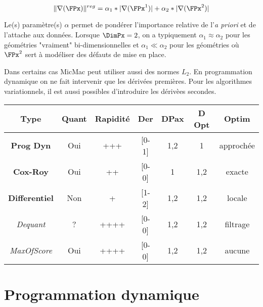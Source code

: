 \begin{equation}
\label{CostGrad:Lun:DDeux}
   \| \nabla(\FPx) \|^{reg} = \alpha_1*|\nabla(\FPx^1)|+\alpha_2*|\nabla(\FPx^2)|
\end{equation}

Le(s) param\`etre(s) $\alpha$ permet de pond\'erer l'importance relative
de l'\emph{a priori} et de l'attache aux donn\'ees.
Lorsque  $\DimPx=2$, on a typiquement 
$\alpha_1 \approx \alpha_2$ pour les g\'eom\'etries "vraiment"
bi-dimensionnelles et  $\alpha_1 \ll \alpha_2$ pour les
g\'eom\'etries o\`u $\FPx^2$ sert \`a mod\'eliser des d\'efauts de mise
en place.

Dans certains cas MicMac peut utiliser aussi des normes $L_2$. 
En programmation dynamique on ne fait intervenir que les d\'eriv\'ees
premi\`eres. Pour les algorithmes variationnels, il est aussi
possibles d'introduire les d\'eriv\`ees secondes.

\begin{tabular} { c | c | c | c| c| c | c} %

 {\bf Type }        &  {Quant} & {Rapidit\'e} & {Der} &  {DPax} &  {D Opt} & {Optim}\\  \hline \hline
 {\bf Prog Dyn }    &  {Oui} & {+++} &          {[0-1]} & {1,2} & {1} &{approch\'ee}\\  \hline 
 {\bf Cox-Roy }     &  {Oui} & {++} &           {[0-0]} & {1} & {1,2} & {exacte}\\  \hline 
 {\bf Differentiel }&  {Non} & {+} &            {[1-2]} & {1,2} & {1,2} &{locale} \\  \hline  \hline
 {\it Dequant }     &  {?} & {++++} &           {[0-0]} & {1,2} & {1,2} &{filtrage}\\  \hline 
 {\it MaxOfScore }  &  {Oui} & {++++} &         {[0-0]} & {1,2} & {1,2} &{aucune} \\  \hline 

\end{tabular}




\section{Programmation dynamique}

